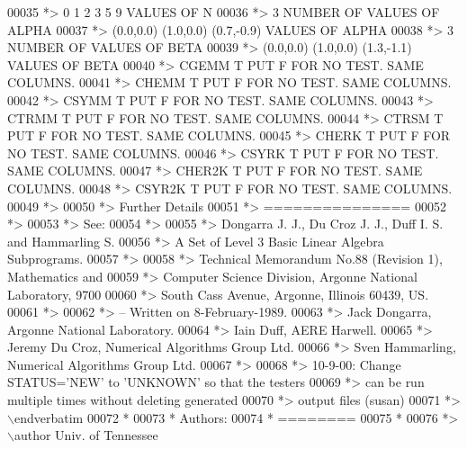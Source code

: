 \begin{DoxyCode}
00035 \textcolor{comment}{*> 0 1 2 3 5 9       VALUES OF N}
00036 \textcolor{comment}{*> 3                 NUMBER OF VALUES OF ALPHA}
00037 \textcolor{comment}{*> (0.0,0.0) (1.0,0.0) (0.7,-0.9)       VALUES OF ALPHA}
00038 \textcolor{comment}{*> 3                 NUMBER OF VALUES OF BETA}
00039 \textcolor{comment}{*> (0.0,0.0) (1.0,0.0) (1.3,-1.1)       VALUES OF BETA}
00040 \textcolor{comment}{*> CGEMM  T PUT F FOR NO TEST. SAME COLUMNS.}
00041 \textcolor{comment}{*> CHEMM  T PUT F FOR NO TEST. SAME COLUMNS.}
00042 \textcolor{comment}{*> CSYMM  T PUT F FOR NO TEST. SAME COLUMNS.}
00043 \textcolor{comment}{*> CTRMM  T PUT F FOR NO TEST. SAME COLUMNS.}
00044 \textcolor{comment}{*> CTRSM  T PUT F FOR NO TEST. SAME COLUMNS.}
00045 \textcolor{comment}{*> CHERK  T PUT F FOR NO TEST. SAME COLUMNS.}
00046 \textcolor{comment}{*> CSYRK  T PUT F FOR NO TEST. SAME COLUMNS.}
00047 \textcolor{comment}{*> CHER2K T PUT F FOR NO TEST. SAME COLUMNS.}
00048 \textcolor{comment}{*> CSYR2K T PUT F FOR NO TEST. SAME COLUMNS.}
00049 \textcolor{comment}{*>}
00050 \textcolor{comment}{*> Further Details}
00051 \textcolor{comment}{*> ===============}
00052 \textcolor{comment}{*>}
00053 \textcolor{comment}{*> See:}
00054 \textcolor{comment}{*>}
00055 \textcolor{comment}{*>    Dongarra J. J., Du Croz J. J., Duff I. S. and Hammarling S.}
00056 \textcolor{comment}{*>    A Set of Level 3 Basic Linear Algebra Subprograms.}
00057 \textcolor{comment}{*>}
00058 \textcolor{comment}{*>    Technical Memorandum No.88 (Revision 1), Mathematics and}
00059 \textcolor{comment}{*>    Computer Science Division, Argonne National Laboratory, 9700}
00060 \textcolor{comment}{*>    South Cass Avenue, Argonne, Illinois 60439, US.}
00061 \textcolor{comment}{*>}
00062 \textcolor{comment}{*> -- Written on 8-February-1989.}
00063 \textcolor{comment}{*>    Jack Dongarra, Argonne National Laboratory.}
00064 \textcolor{comment}{*>    Iain Duff, AERE Harwell.}
00065 \textcolor{comment}{*>    Jeremy Du Croz, Numerical Algorithms Group Ltd.}
00066 \textcolor{comment}{*>    Sven Hammarling, Numerical Algorithms Group Ltd.}
00067 \textcolor{comment}{*>}
00068 \textcolor{comment}{*>    10-9-00:  Change STATUS='NEW' to 'UNKNOWN' so that the testers}
00069 \textcolor{comment}{*>              can be run multiple times without deleting generated}
00070 \textcolor{comment}{*>              output files (susan)}
00071 \textcolor{comment}{*> \(\backslash\)endverbatim}
00072 \textcolor{comment}{*}
00073 \textcolor{comment}{*  Authors:}
00074 \textcolor{comment}{*  ========}
00075 \textcolor{comment}{*}
00076 \textcolor{comment}{*> \(\backslash\)author Univ. of Tennessee }

\end{DoxyCode}
